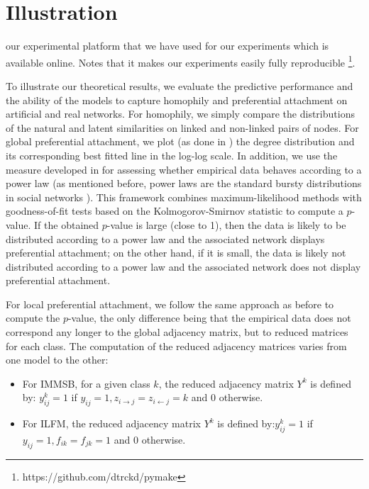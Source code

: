 \section{Illustration}

our experimental platform that we have used for our experiments which is available online. Notes that it makes our experiments easily fully reproducible \footnote{https://github.com/dtrckd/pymake}.

To illustrate our theoretical results, we evaluate the predictive performance and the ability of the models to capture homophily and preferential attachment on artificial and real networks. For homophily, we simply compare the distributions of the natural and latent similarities on linked and non-linked pairs of nodes. For global preferential attachment, we plot (as done in \cite{???}) the degree distribution and its corresponding best fitted line in the log-log scale. In addition, we use the measure developed in \cite{clauset2009power} for assessing whether empirical data behaves according to a power law (as mentioned before, power laws are the standard bursty distributions in social networks \cite{barabasi1999emergence}). This framework combines maximum-likelihood methods with goodness-of-fit tests based on the Kolmogorov-Smirnov statistic to compute a $p$-value. If the obtained $p$-value is large (close to 1), then the data is likely to be distributed according to a power law and the associated network displays preferential attachment;  on the other hand, if it is small, the data is likely not distributed according to a power law and the associated network does not display preferential attachment.

For local preferential attachment, we follow the same approach as before to compute the $p$-value, the only difference being that the empirical data does not correspond any longer to the global adjacency matrix, but to reduced matrices for each class. The computation of the reduced adjacency matrices varies from one model to the other:
%
\begin{itemize}
    \item For IMMSB, for a given class $k$, the reduced adjacency matrix $Y^k$ is defined by: $y_{ij}^k=1$ if $y_{ij}=1, z_{i\rightarrow j}=z_{i\leftarrow j}=k$ and $0$ otherwise.
        \item For ILFM, the reduced adjacency matrix $Y^k$ is defined by:$ y_{ij}^k=1$ if $y_{ij}=1 , f_{ik}=f_{jk}=1$ and $0$ otherwise.
\end{itemize}
%

